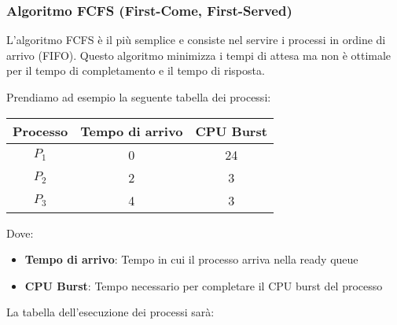 \documentclass[a4paper]{article}
\begin{document}
\subsubsection{Algoritmo FCFS (First-Come, First-Served)}
L'algoritmo FCFS è il più semplice e consiste nel servire i processi in ordine di
arrivo (FIFO). Questo algoritmo minimizza i tempi di attesa ma non è ottimale per
il tempo di completamento e il tempo di risposta.
\begin{example}
  \label{ex:fcfs}
  Prendiamo ad esempio la seguente tabella dei processi:
  \begin{table}[H]
    \centering
    \begin{tabular}{c|c|c}
      Processo & Tempo di arrivo & CPU Burst \\
      \hline
      \( P_1 \) & 0 & 24 \\
      \( P_2 \) & 2 & 3 \\
      \( P_3 \) & 4 & 3 \\
    \end{tabular}
  \end{table}
  \noindent
  Dove:
  \begin{itemize}
    \item \textbf{Tempo di arrivo}: Tempo in cui il processo arriva nella ready queue
    \item \textbf{CPU Burst}: Tempo necessario per completare il CPU burst del processo
  \end{itemize}
  La tabella dell'esecuzione dei processi sarà:
  \begin{figure}[H]
    \centering
\end{figure}
\end{example}
\end{document}
